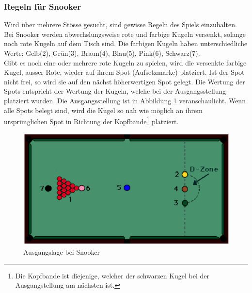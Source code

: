 \subsubsection{Regeln für Snooker}\label{kap:tiefensuche:regeln_fuer_snooker}
Wird über mehrere Stösse gesucht, sind gewisse Regeln des Spiels einzuhalten. Bei Snooker werden abwechslungsweise rote
und farbige Kugeln versenkt, solange noch rote Kugeln auf dem Tisch sind. Die farbigen Kugeln haben unterschiedliche
Werte: Gelb(2), Grün(3), Braun(4), Blau(5), Pink(6), Schwarz(7)\cite{stoppball:spielregel:snooker}.\\
Gibt es noch eine oder mehrere rote Kugeln zu spielen, wird die versenkte farbige Kugel, ausser Rote, wieder
auf ihrem Spot (Aufsetzmarke) platziert. Ist der Spot nicht frei, so wird sie auf den nächst höherwertigen Spot gelegt. Die Wertung
der Spots entspricht der Wertung der Kugeln, welche bei der Ausgangsstellung platziert wurden. Die Ausgangsstellung ist in
Abbildung \ref{fig:snooker_ausgangslage} veranschaulicht. Wenn alle Spots belegt sind, wird die Kugel so nah wie möglich an ihrem ursprünglichen
Spot in Richtung der Kopfbande\footnote{Die Kopfbande ist diejenige, welcher der schwarzen Kugel bei der Ausgangstellung am
nächsten ist.} platziert\cite{stoppball:spielregel:snooker}.

\begin{figure}[h!]
    \begin{center}
        \includegraphics[width=0.4\linewidth]{../common/03_billiard_ai/resources/39_snooker_ausgangslage.png}
    \end{center}
    \caption{Ausgangslage bei Snooker\cite{stoppball:spielregel:snooker}}
    \label{fig:snooker_ausgangslage}
\end{figure}


